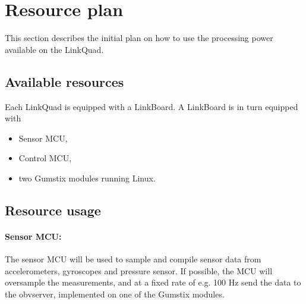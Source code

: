 \section{Resource plan}
\label{sec:resourceplan}
This section describes the initial plan on how to use the processing
power available on the LinkQuad.
    \subsection{Available resources}
        Each LinkQuad is equipped with a LinkBoard.
        A LinkBoard is in turn equipped with
        \begin{itemize}
            \item Sensor MCU,
            \item Control MCU,
            \item two Gumstix\textsuperscript{\textregistered} modules running Linux.
        \end{itemize}

    \subsection{Resource usage}
        \paragraph{Sensor MCU: } The sensor MCU will be used to sample
        and compile sensor data from accelerometers, gyroscopes and pressure sensor.
        If possible, the MCU will oversample the measurements, and at
        a fixed rate of e.g. 100 Hz send the data to the obvserver, implemented on
        one of the Gumstix\textsuperscript{\textregistered} modules.
    


